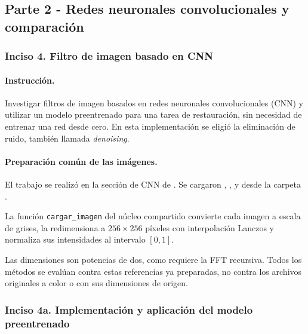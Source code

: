\documentclass[11pt]{article}
\begin{document}

\clearpage


\subsection*{
    Parte 2 - Redes neuronales convolucionales y comparación
}

\noindent

\subsubsection*{Inciso 4. Filtro de imagen basado en CNN}

\paragraph{Instrucción.}

Investigar filtros de imagen basados en redes neuronales
convolucionales (CNN) y utilizar un modelo preentrenado para
una tarea de restauración, sin necesidad de entrenar una red
desde cero. En esta implementación se eligió la eliminación
de ruido, también llamada \textit{denoising}.

\paragraph{Preparación común de las imágenes.}

El trabajo se realizó en la sección de CNN de
.
Se cargaron , ,
 y  desde la carpeta
.

La función \texttt{cargar\_imagen} del núcleo compartido
convierte cada imagen a escala de grises, la redimensiona a
$256\times256$ píxeles con interpolación Lanczos y normaliza
sus intensidades al intervalo $[0,1]$.

Las dimensiones son potencias de dos, como requiere la FFT
recursiva. Todos los métodos se evalúan contra estas
referencias ya preparadas, no contra los archivos originales
a color o con sus dimensiones de origen.

\subsubsection*{
    Inciso 4a. Implementación y aplicación del modelo preentrenado
}
\end{document}
